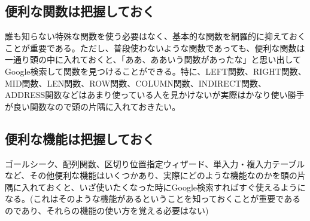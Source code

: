 \documentclass[dvipdfmx]{jsarticle}
\begin{document}
\subsection{便利な関数は把握しておく}
誰も知らない特殊な関数を使う必要はなく、基本的な関数を網羅的に抑えておくことが重要である。ただし、普段使わないような関数であっても、便利な関数は一通り頭の中に入れておくと、「ああ、ああいう関数があったな」と思い出してGoogle検索して関数を見つけることができる。特に、LEFT関数、RIGHT関数、MID関数、LEN関数、ROW関数、COLUMN関数、INDIRECT関数、ADDRESS関数などはあまり使っている人を見かけないが実際はかなり使い勝手が良い関数なので頭の片隅に入れておきたい。

\subsection{便利な機能は把握しておく}
ゴールシーク、配列関数、区切り位置指定ウィザード、単入力・複入力テーブルなど、その他便利な機能はいくつかあり、実際にどのような機能なのかを頭の片隅に入れておくと、いざ使いたくなった時にGoogle検索すればすぐ使えるようになる。(これはそのような機能があるということを知っておくことが重要であるのであり、それらの機能の使い方を覚える必要はない)
\end{document}
